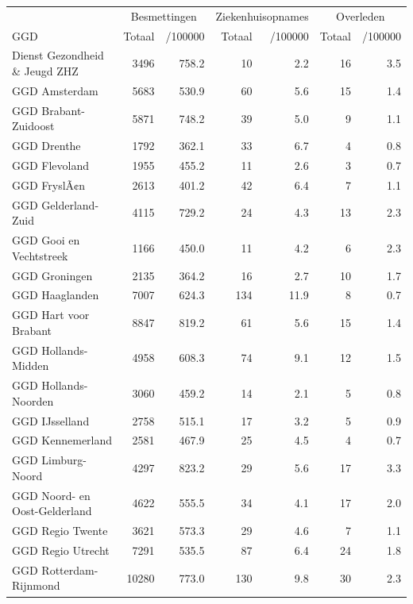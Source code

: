 \documentclass[
  english,
  man,floatsintext]{apa6}
\begin{document}
\begin{table}
\centering\begingroup\fontsize{10}{12}\selectfont

\begin{threeparttable}
\begin{tabular}{lrrrrrr}
\toprule
\multicolumn{1}{c}{ } & \multicolumn{2}{c}{Besmettingen} & \multicolumn{2}{c}{Ziekenhuisopnames} & \multicolumn{2}{c}{Overleden} \\
\cmidrule(l{3pt}r{3pt}){2-3} \cmidrule(l{3pt}r{3pt}){4-5} \cmidrule(l{3pt}r{3pt}){6-7}
GGD & Totaal & /100000 & Totaal & /100000 & Totaal & /100000\\
\midrule
Dienst Gezondheid \& Jeugd ZHZ & 3496 & 758.2 & 10 & 2.2 & 16 & 3.5\\
GGD Amsterdam & 5683 & 530.9 & 60 & 5.6 & 15 & 1.4\\
GGD Brabant-Zuidoost & 5871 & 748.2 & 39 & 5.0 & 9 & 1.1\\
GGD Drenthe & 1792 & 362.1 & 33 & 6.7 & 4 & 0.8\\
GGD Flevoland & 1955 & 455.2 & 11 & 2.6 & 3 & 0.7\\
GGD FryslÃ¢n & 2613 & 401.2 & 42 & 6.4 & 7 & 1.1\\
GGD Gelderland-Zuid & 4115 & 729.2 & 24 & 4.3 & 13 & 2.3\\
GGD Gooi en Vechtstreek & 1166 & 450.0 & 11 & 4.2 & 6 & 2.3\\
GGD Groningen & 2135 & 364.2 & 16 & 2.7 & 10 & 1.7\\
GGD Haaglanden & 7007 & 624.3 & 134 & 11.9 & 8 & 0.7\\
GGD Hart voor Brabant & 8847 & 819.2 & 61 & 5.6 & 15 & 1.4\\
GGD Hollands-Midden & 4958 & 608.3 & 74 & 9.1 & 12 & 1.5\\
GGD Hollands-Noorden & 3060 & 459.2 & 14 & 2.1 & 5 & 0.8\\
GGD IJsselland & 2758 & 515.1 & 17 & 3.2 & 5 & 0.9\\
GGD Kennemerland & 2581 & 467.9 & 25 & 4.5 & 4 & 0.7\\
GGD Limburg-Noord & 4297 & 823.2 & 29 & 5.6 & 17 & 3.3\\
GGD Noord- en Oost-Gelderland & 4622 & 555.5 & 34 & 4.1 & 17 & 2.0\\
GGD Regio Twente & 3621 & 573.3 & 29 & 4.6 & 7 & 1.1\\
GGD Regio Utrecht & 7291 & 535.5 & 87 & 6.4 & 24 & 1.8\\
GGD Rotterdam-Rijnmond & 10280 & 773.0 & 130 & 9.8 & 30 & 2.3\\

\end{tabular}
\end{threeparttable}
\end{table}
\end{document}
